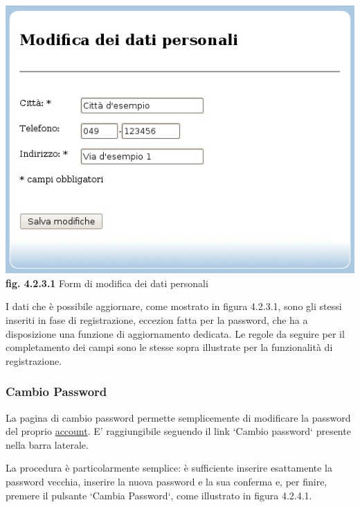 \documentclass[11pt,a4paper]{article}
\begin{document}
\begin{center}
	\includegraphics[scale=0.5]{images/dati_personali.jpg}\\ 
	\textbf{fig. 4.2.3.1} Form di modifica dei dati personali\\
\end{center}
\bigskip

I dati che è possibile aggiornare, come mostrato in figura 4.2.3.1, sono gli stessi inseriti in fase di registrazione, eccezion fatta per la password, che ha a disposizione una funzione di aggiornamento dedicata. Le regole da seguire per il completamento dei campi sono le stesse sopra illustrate per la funzionalità di registrazione.
\subsubsection{Cambio Password}
La pagina di cambio password permette semplicemente di modificare la password del proprio \underline{account}. E' raggiungibile seguendo il link `Cambio password` presente nella barra laterale.

La procedura è particolarmente semplice: è sufficiente inserire esattamente la password vecchia, inserire la nuova password e la sua conferma e, per finire, premere il pulsante `Cambia Password`, come illustrato in figura 4.2.4.1.
\end{document}
